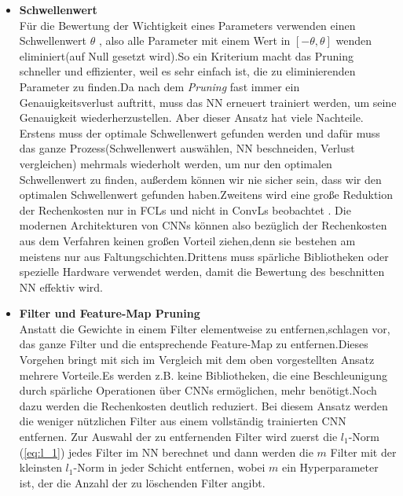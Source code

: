 \documentclass[12pt,a4paper]{scrartcl}
\numberwithin{equation}{section}
\begin{document}
\begin{itemize}
		\item \textbf{Schwellenwert}\label{Schwellenwert}\\
			Für die Bewertung der Wichtigkeit eines Parameters verwenden \cite[Han et al]{pruning} einen Schwellenwert $ \theta $ , also alle Parameter mit einem Wert in $ [-\theta, \theta] $ wenden eliminiert(auf Null gesetzt wird).So ein Kriterium macht das Pruning schneller und effizienter, weil es sehr einfach ist, die zu eliminierenden Parameter zu finden.Da nach dem \textit{Pruning} fast immer ein Genauigkeitsverlust auftritt, muss das \ac{NN} erneuert trainiert werden, um seine Genauigkeit wiederherzustellen. Aber dieser Ansatz hat viele Nachteile. Erstens muss der optimale Schwellenwert gefunden werden und dafür muss das ganze Prozess(Schwellenwert auswählen, \ac{NN} beschneiden, Verlust vergleichen) mehrmals wiederholt werden, um nur den optimalen Schwellenwert zu finden, außerdem können wir nie sicher sein, dass wir den optimalen Schwellenwert gefunden haben.Zweitens wird eine  große Reduktion der Rechenkosten nur in \acsp{FCL} und nicht in \acsp{ConvL} beobachtet \cite{Filter Pruning}. Die modernen Architekturen von \acsp{CNN} können also bezüglich der Rechenkosten aus dem Verfahren keinen großen Vorteil ziehen,denn sie bestehen am meistens nur aus Faltungschichten.Drittens muss spärliche Bibliotheken oder spezielle Hardware verwendet werden, damit die Bewertung des beschnitten \ac{NN} effektiv wird.
	
	\item \textbf{Filter und Feature-Map Pruning}\\
		Anstatt die Gewichte in einem Filter elementweise zu entfernen,schlagen  \cite[Li et al]{Filter Pruning} vor, das ganze Filter und die entsprechende Feature-Map zu entfernen.Dieses Vorgehen bringt mit sich im Vergleich mit dem oben vorgestellten Ansatz mehrere Vorteile.Es werden z.B. keine Bibliotheken, die eine Beschleunigung durch spärliche Operationen über \acsp{CNN} ermöglichen, mehr benötigt.Noch dazu werden die Rechenkosten deutlich reduziert. Bei diesem Ansatz werden die weniger nützlichen Filter aus einem vollständig trainierten \ac{CNN}  entfernen. Zur Auswahl der zu entfernenden Filter wird zuerst die $ l_1$-Norm (\ref{eq:l_1}) jedes Filter im \ac{NN} berechnet und dann werden die $ m $ Filter mit der kleinsten $ l_1 $-Norm in jeder Schicht entfernen, wobei $ m $ ein Hyperparameter ist, der die Anzahl der zu löschenden Filter angibt.
		

\end{itemize}
\end{document}

